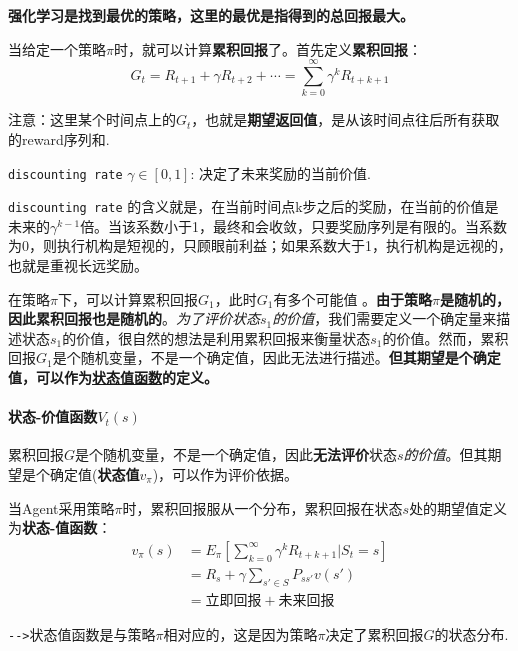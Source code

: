 \documentclass[UTF8,a4paper,12pt]{ctexbook}
\begin{document}
				\textbf{强化学习是找到最优的策略，这里的最优是指得到的总回报最大。}
				
				当给定一个策略$\pi$时，就可以计算\textbf{累积回报}了。首先定义\textbf{累积回报}：
				\begin{equation}
					G_t = R_{t+1} + \gamma R_{t+2} + \cdots = \sum_{k=0}^\infty \gamma^k R_{t+k+1}
				\end{equation}
				
				注意：这里某个时间点上的$G_t$，也就是\textbf{期望返回值}，是从该时间点往后所有获取的reward序列和.
				
				\verb|discounting rate| $\gamma \in [0,1]$: 决定了未来奖励的当前价值.
				
				\verb|discounting rate| 的含义就是，在当前时间点k步之后的奖励，在当前的价值是未来的$\gamma^{k-1}$倍。当该系数小于1，最终和会收敛，只要奖励序列是有限的。当系数为0，则执行机构是短视的，只顾眼前利益；如果系数大于1，执行机构是远视的，也就是重视长远奖励。
				
				在策略$\pi$下，可以计算累积回报$G_1$，此时$G_1$有多个可能值 。\textbf{由于策略}$\pi$\textbf{是随机的，因此累积回报也是随机的}。\textit{为了评价状态}$s_1$\textit{的价值}，我们需要定义一个确定量来描述状态$s_1$的价值，很自然的想法是利用累积回报来衡量状态$s_1$的价值。然而，累积回报$G_1$是个随机变量，不是一个确定值，因此无法进行描述。\textbf{但其期望是个确定值，可以作为\underline{状态值函数}的定义。}
				
			
			\paragraph{状态-价值函数$V_t(s)$}
			
				累积回报$G$是个随机变量，不是一个确定值，因此\textbf{无法评价}状态$s$\textit{的价值}。但其期望是个确定值(\textbf{状态值}$v_\pi$)，可以作为评价依据。
			
				当Agent采用策略$\pi$时，累积回报服从一个分布，累积回报在状态$s$处的期望值定义为\textbf{状态-值函数}：
				\begin{equation}
					\begin{aligned}
						v_\pi(s) &= E_\pi \left[\sum_{k=0}^{\infty}\gamma^k R_{t+k+1}|S_t = s \right]	\\
							&= R_s + \gamma \sum_{s' \in S}P_{ss'}v(s') \\
							&= \textit{立即回报} + \textit{未来回报}
					\end{aligned}
				\end{equation}
				
				\verb|-->|状态值函数是与策略$\pi$相对应的，这是因为策略$\pi$决定了累积回报$G$的状态分布.
			
\end{document}
